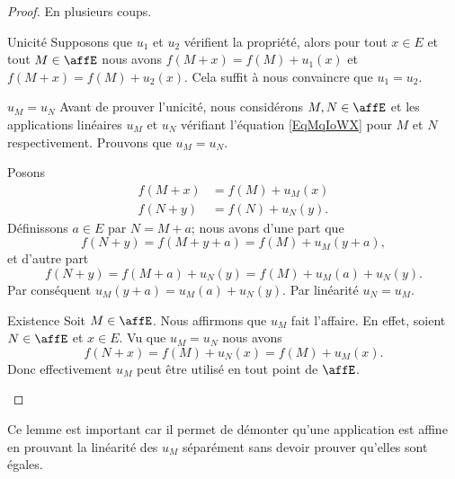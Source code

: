 \begin{proof}
    En plusieurs coups.
    \begin{subproof}
        \item[Unicité]
            Supposons que \( u_1\) et \( u_2\) vérifient la propriété, alors pour tout \( x\in E\) et tout \( M\in \affE\) nous avons \( f(M+x)=f(M)+u_1(x)\) et \( f(M+x)=f(M)+u_2(x)\). Cela suffit à nous convaincre que \( u_1=u_2\).
        \item[\( u_M=u_N\)]
            Avant de prouver l'unicité, nous considérons \( M,N\in \affE\) et les applications linéaires \( u_M\) et \( u_N\) vérifiant l'équation \eqref{EqMqIoWX} pour \( M\) et \( N\) respectivement. Prouvons que \( u_M=u_N\).

            Posons
            \begin{subequations}
                \begin{align}
                    f(M+x)&=f(M)+u_M(x)\\
                    f(N+y)&=f(N)+u_N(y).
                \end{align}
            \end{subequations}
            Définissons \( a\in E\) par \( N=M+a\); nous avons d'une part que
            \begin{equation}
                f(N+y)=f(M+y+a)=f(M)+u_M(y+a),
            \end{equation}
            et d'autre part
            \begin{equation}
                f(N+y)=f(M+a)+u_N(y)=f(M)+u_M(a)+u_N(y).
            \end{equation}
            Par conséquent \( u_M(y+a)=u_M(a)+u_N(y)\). Par linéarité \( u_N=u_M\).
        \item[Existence]
            Soit \( M\in \affE\). Nous affirmons que \( u_M\) fait l'affaire. En effet, soient \( N\in \affE\) et \( x\in E\). Vu que \( u_M=u_N\) nous avons
            \begin{equation}
                f(N+x)=f(M)+u_N(x)=f(M)+u_M(x).
            \end{equation}
            Donc effectivement \( u_M\) peut être utilisé en tout point de \( \affE\).
  \end{subproof}
\end{proof}
Ce lemme est important car il permet de démonter qu'une application est affine en prouvant la linéarité des \( u_M\) séparément sans devoir prouver qu'elles sont égales.

